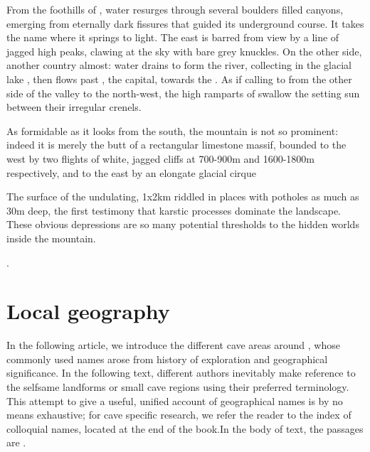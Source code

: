 From the foothills of , water resurges through several boulders filled canyons, emerging from eternally dark fissures that guided its underground course. It takes the name  where it springs to light.  The east is barred from view by a line of jagged high peaks, clawing at the sky with bare grey knuckles. On the other side, another country almost: water drains to form the \passage{} river, collecting in the glacial lake , then flows past , the capital, towards the . As if calling to  from the other side of the  valley to the north-west, the high ramparts of  swallow the setting sun between their irregular crenels.

As formidable as it looks from the south, the mountain is not so prominent: indeed it is merely the butt of a rectangular limestone massif, bounded to the west by two flights of white, jagged cliffs at 700-900m and 1600-1800m respectively, and to the east by an elongate glacial cirque 

The surface of the undulating, 1x2km  riddled in places with potholes as much as 30m deep, the first testimony that karstic processes dominate the landscape. These obvious depressions are so many potential thresholds to the hidden worlds inside the mountain.

. 

\section{Local geography}
In the following article, we introduce the different cave areas around , whose commonly used names arose from history of exploration and geographical significance. In the following text, different authors inevitably make reference to the selfsame landforms or small cave regions using their preferred terminology.
This attempt to give a useful, unified account of geographical names is by no means exhaustive; for cave specific research, we refer the reader to the index of colloquial names, located at the end of the book.In the body of text, the passages are .

